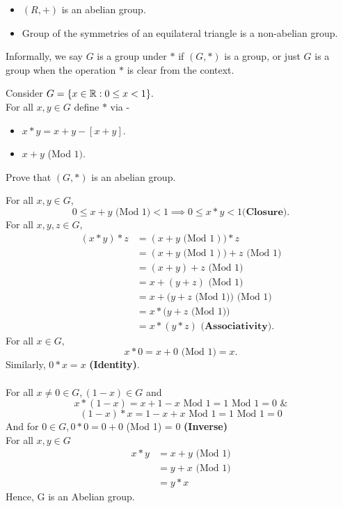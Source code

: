 \begin{eg}
    \begin{itemize}
        \item $(R, +)$ is an abelian group.
        \item Group of the symmetries of an equilateral triangle is a non-abelian group.
    \end{itemize}
\end{eg}
Informally, we say $G$ is a group under $*$ if $(G, *)$ is a group, or just $G$ is a group when the operation $*$ is clear from the context.
\begin{eg}
    Consider $G = \{x \in \mathbb{R}: 0 \le x < 1\}.$ \\For all $x, y \in G$ define $*$ via -
    \begin{itemize}
        \item $x*y = x+y - [x+y]$.
        \item $x+y$ (Mod $1)$.
    \end{itemize}
    Prove that $(G, *)$ is an abelian group.
\end{eg}
\begin{explanation}
    For all $x,y \in G,$
    $$
    0 \le x+y \text{ (Mod 1)} < 1 \implies 0 \le x*y < 1\textbf{(Closure)}.
    $$
    For all $x,y,z \in G,$
    \begin{align*}
        (x * y) * z &= (x + y \text{ (Mod 1})) * z\\
                    &= (x + y \text{ (Mod 1})) + z \text{ (Mod 1)}\\
                    &= (x + y) + z \text{ (Mod 1)}\\
                    &= x + (y + z) \text{ (Mod 1)}\\
                    &= x + (y + z \text{ (Mod 1))} \text{ (Mod 1)}\\
                    &= x * (y + z \text{ (Mod 1))}\\
                    &= x * (y * z) \textbf{ (Associativity)}.
    \end{align*}
    For all $x \in G,$
    $$
    x * 0 = x+0 \text{ (Mod 1)} = x.
    $$
    Similarly, $0*x = x$ \textbf{(Identity)}.\\\\
    For all $x \neq0 \in G, (1-x) \in G$ and
    $$
    x * (1-x) = x + 1 - x \text{ Mod 1} = 1 \text{ Mod 1} = 0 \text{ \&}
    $$$$
    (1-x) * x = 1 - x + x \text{ Mod 1} = 1 \text{ Mod 1} = 0
    $$
    And for $0 \in G, 0 * 0 = 0 + 0$ (Mod 1) = 0 \textbf{(Inverse)}\\
    For all $x,y \in G$
    \begin{align*}
        x * y &= x + y \text{ (Mod 1)}\\
              &= y + x \text{ (Mod 1)}\\
              &= y * x
    \end{align*}
    Hence, G is an Abelian group.
\end{explanation}

